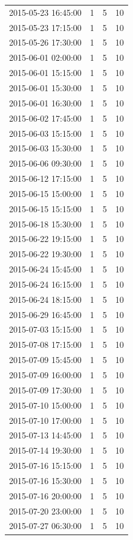 \begin{tabular}{lrrr}
2015-05-23 16:45:00 & 1 & 5 & 10 \\
2015-05-23 17:15:00 & 1 & 5 & 10 \\
2015-05-26 17:30:00 & 1 & 5 & 10 \\
2015-06-01 02:00:00 & 1 & 5 & 10 \\
2015-06-01 15:15:00 & 1 & 5 & 10 \\
2015-06-01 15:30:00 & 1 & 5 & 10 \\
2015-06-01 16:30:00 & 1 & 5 & 10 \\
2015-06-02 17:45:00 & 1 & 5 & 10 \\
2015-06-03 15:15:00 & 1 & 5 & 10 \\
2015-06-03 15:30:00 & 1 & 5 & 10 \\
2015-06-06 09:30:00 & 1 & 5 & 10 \\
2015-06-12 17:15:00 & 1 & 5 & 10 \\
2015-06-15 15:00:00 & 1 & 5 & 10 \\
2015-06-15 15:15:00 & 1 & 5 & 10 \\
2015-06-18 15:30:00 & 1 & 5 & 10 \\
2015-06-22 19:15:00 & 1 & 5 & 10 \\
2015-06-22 19:30:00 & 1 & 5 & 10 \\
2015-06-24 15:45:00 & 1 & 5 & 10 \\
2015-06-24 16:15:00 & 1 & 5 & 10 \\
2015-06-24 18:15:00 & 1 & 5 & 10 \\
2015-06-29 16:45:00 & 1 & 5 & 10 \\
2015-07-03 15:15:00 & 1 & 5 & 10 \\
2015-07-08 17:15:00 & 1 & 5 & 10 \\
2015-07-09 15:45:00 & 1 & 5 & 10 \\
2015-07-09 16:00:00 & 1 & 5 & 10 \\
2015-07-09 17:30:00 & 1 & 5 & 10 \\
2015-07-10 15:00:00 & 1 & 5 & 10 \\
2015-07-10 17:00:00 & 1 & 5 & 10 \\
2015-07-13 14:45:00 & 1 & 5 & 10 \\
2015-07-14 19:30:00 & 1 & 5 & 10 \\
2015-07-16 15:15:00 & 1 & 5 & 10 \\
2015-07-16 15:30:00 & 1 & 5 & 10 \\
2015-07-16 20:00:00 & 1 & 5 & 10 \\
2015-07-20 23:00:00 & 1 & 5 & 10 \\
2015-07-27 06:30:00 & 1 & 5 & 10 \\

\end{tabular}
